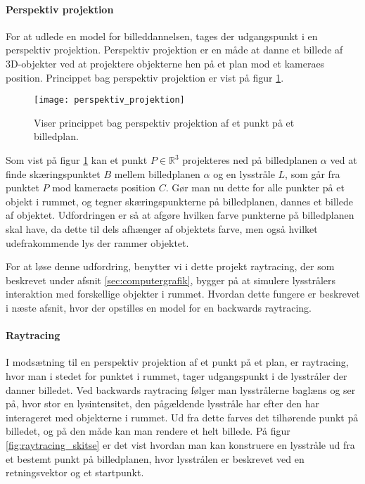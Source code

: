 \paragraph{Perspektiv projektion}
For at udlede en model for billeddannelsen, tages der udgangspunkt i en perspektiv projektion. Perspektiv projektion er en måde at danne et billede af 3D-objekter ved at projektere objekterne hen på et plan mod et kameraes position\cite{fig:perspective_projection}. Princippet bag perspektiv projektion er vist på figur \ref{fig:perspektiv_projektion}.

\begin{figure}[H]
  \label{fig:perspektiv_projektion}
  \centering
  \texttt{[image: perspektiv\_projektion]}
  \caption{Viser princippet bag perspektiv projektion af et punkt på et billedplan.}
\end{figure}

Som vist på figur \ref{fig:perspektiv_projektion} kan et punkt $P\in \mathbb{R}^3$ projekteres ned på billedplanen $\alpha$ ved at finde skæringspunktet $B$ mellem billedplanen $\alpha$ og en lysstråle $L$, som går fra punktet $P$ mod kameraets position $C$. Gør man nu dette for alle punkter på et objekt i rummet, og tegner skæringspunkterne på billedplanen, dannes et billede af objektet. Udfordringen er så at afgøre hvilken farve punkterne på billedplanen skal have, da dette til dels afhænger af objektets farve, men også hvilket udefrakommende lys der rammer objektet. 

For at løse denne udfordring, benytter vi i dette projekt raytracing, der som beskrevet under afsnit \ref{sec:computergrafik}, bygger på at simulere lysstrålers interaktion med forskellige objekter i rummet. Hvordan dette fungere er beskrevet i næste afsnit, hvor der opstilles en model for en backwards raytracing.

\paragraph{Raytracing}
I modsætning til en perspektiv projektion af et punkt på et plan, er raytracing, hvor man i stedet for punktet i rummet, tager udgangspunkt i de lysstråler der danner billedet. Ved backwards raytracing følger man lysstrålerne baglæns og ser på, hvor stor en lysintensitet, den pågældende lysstråle har efter den har interageret med objekterne i rummet. Ud fra dette farves det tilhørende punkt på billedet, og på den måde kan man rendere et helt billede. På figur \ref{fig:raytracing_skitse} er det vist hvordan man kan konstruere en lysstråle ud fra et bestemt punkt på billedplanen, hvor lysstrålen er beskrevet ved en retningsvektor og et startpunkt.

